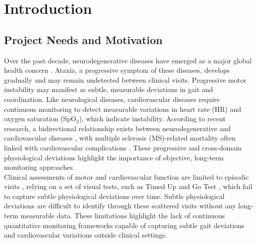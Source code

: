 
\chapter{Introduction}
\label{chapter:introduction}


\section{Project Needs and Motivation}

Over the past decade, neurodegenerative diseases have emerged as a major global health concern \cite{who2024neurological}. Ataxia, a progressive symptom of these diseases, develops gradually and may remain undetected between clinical visits. Progressive motor instability may manifest as subtle, measurable deviations in gait and coordination. Like neurological diseases, cardiovascular diseases require continuous monitoring to detect measurable variations in heart rate (HR) and oxygen saturation (SpO$_2$), which indicate instability. According to recent research, a bidirectional relationship exists between neurodegenerative and cardiovascular diseases \cite{frontiers2024neurocardio}, with multiple sclerosis (MS)-related mortality often linked with cardiovascular complications \cite{mincu2015cardiovascular}. These progressive and cross-domain physiological deviations highlight the importance of objective, long-term monitoring approaches.\\ 

Clinical assessments of motor and cardiovascular function are limited to episodic visits \cite{droracle2025msfollowup, ayoola2025primarycare}, relying on a set of visual tests, such as Timed Up and Go Test \cite{droracle2025msfollowup}, which fail to capture subtle physiological deviations over time. Subtle physiological deviations are difficult to identify through these scattered visits without any long-term measurable data. These limitations highlight the lack of continuous quantitative monitoring frameworks capable of capturing subtle gait deviations and cardiovascular variations outside clinical settings.\\

